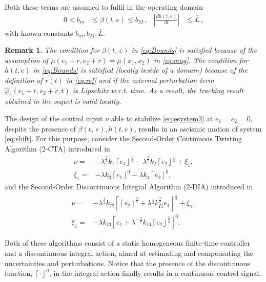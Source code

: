 \documentclass[journal,twoside,web]{ieeecolor}
\newcommand{\Sabs}[1]{\left\lceil #1 \right\rfloor}
\newtheorem{remark}{Remark}
\begin{document}
Both these terms are assumed to fulfil in the operating domain
\begin{align}
0 < b_m & \leq \beta(t,e) \leq b_M\,, & \left| \frac{dh(t,e)}{dt}\right| & \leq \bar{L}\,,
\label{eq:Bounds}
\end{align} 
with known constants $b_m,b_M,\bar{L}$. 

\begin{remark}
The condition for $\beta(t,\,e)$ in \eqref{eq:Bounds} is satisfied because of the assumption of $\mu(e_1+r,e_2+\dot{r})=\mu(x_1,x_2)$ in \eqref{eq:mug}. The condition for $h(t,e)$ in \eqref{eq:Bounds} is satisfied (locally inside of a domain) because of the definition of $r(t)$ in \eqref{eq:ref} and if the external perturbation term $\hat{\varphi}_e(e_1+r,e_2+\dot{r},t)$ is Lipschitz w.r.t. time. As a result, the tracking result obtained in the sequel is valid locally.
\label{rem:domain}
\end{remark}

The design of the control input $\nu$ able to stabilize \eqref{eq:esystem3} at $e_1=e_2=0$, despite the presence of $\beta(t,\,e),h(t,e)$, results in an aseismic motion of system \eqref{eq:shift}. For this purpose, consider the Second-Order Continuous Twisting Algorithm (2-CTA) introduced in \cite{b:Torres-Sanchez-Fridman-Moreno}
\begin{equation}
	\begin{split}
	\nu = & - \lambda^{\frac{2}{3}} k_1\Sabs{e_1}^{\frac{1}{3}}- \lambda^{\frac{1}{2}} k_2\Sabs{e_2}^{\frac{1}{2}} + \xi_1,\\
	\dot{\xi}_1 = & - \lambda k_3\Sabs{e_1}^{0}- \lambda k_4\Sabs{e_2}^{0},
	\end{split}
	\label{eq:cta}
\end{equation}
and the Second-Order Discontinuous Integral Algorithm (2-DIA) introduced in \cite{b:Moreno_2016}
\begin{equation}
	\begin{split}
	\nu = & - \lambda^{\frac{1}{2}} k_{I2}\Sabs{\Sabs{e_2}^{\frac{3}{2}} + \lambda^{\frac{1}{2}} k_{I1}^{\frac{3}{2}} e_1}^{\frac{1}{3}} + \xi_1,\\
	\dot{\xi}_1 = & - \lambda k_{I3} \Sabs{e_1 + \lambda^{-\frac{1}{2}} k_{I4} \Sabs{e_2}^{\frac{3}{2}}}^{0}.
	\end{split}
	\label{eq:dia}
\end{equation} 

Both of these algorithms consist of a static homogeneous finite-time controller and a discontinuous integral action, aimed at estimating and compensating the uncertainties and perturbations. Notice that the presence of the discontinuous function, $\Sabs{\cdot}^{0}$, in the integral action finally results in a continuous control signal. 
\end{document}
